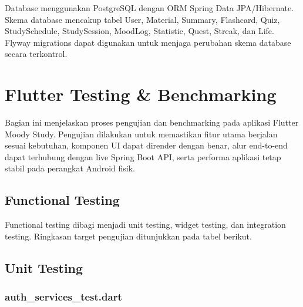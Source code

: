 \documentclass[11pt]{article}
\begin{document}
Database menggunakan PostgreSQL dengan ORM Spring Data JPA/Hibernate. Skema database mencakup tabel User, Material, Summary, Flashcard, Quiz, StudySchedule, StudySession, MoodLog, Statistic, Quest, Streak, dan Life. Flyway migrations dapat digunakan untuk menjaga perubahan skema database secara terkontrol.


\section{Flutter Testing \& Benchmarking}

Bagian ini menjelaskan proses pengujian dan benchmarking pada aplikasi Flutter Moody Study. Pengujian dilakukan untuk memastikan fitur utama berjalan sesuai kebutuhan, komponen UI dapat dirender dengan benar, alur end-to-end dapat terhubung dengan live Spring Boot API, serta performa aplikasi tetap stabil pada perangkat Android fisik.

\subsection{Functional Testing}

Functional testing dibagi menjadi unit testing, widget testing, dan integration testing. Ringkasan target pengujian ditunjukkan pada tabel berikut.

\begin{center}
\renewcommand{\arraystretch}{1.3}
\end{center}

\subsection{Unit Testing}

\subsubsection{auth\_services\_test.dart}
\end{document}
